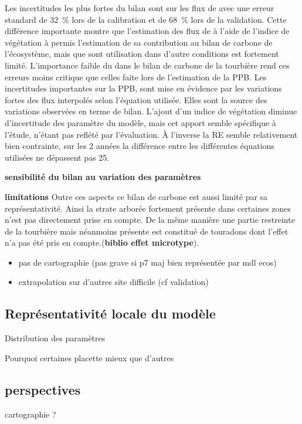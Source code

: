 Les incertitudes les plus fortes du bilan sont sur les flux de \chh avec une erreur standard de \SI{32}{\percent} lors de la calibration et de \SI{68}{\percent} lors de la validation.
Cette différence importante montre que l'estimation des flux de \chh à l'aide de l'indice de végétation à permis l'estimation de sa contribution au bilan de carbone de l'écosystème, mais que sont utilisation dans d'autre conditions est fortement limité.
L'importance faible du \chh dans le bilan de carbone de la tourbière rend ces erreurs moins critique que celles faite lors de l'estimation de la PPB.
Les incertitudes importantes sur la PPB, sont mise en évidence par les variations fortes des flux interpolés selon l'équation utilisée.
Elles sont la source des variations observées en terme de bilan.
L'ajout d'un indice de végétation diminue d'incertitude des paramètre du modèle, mais cet apport semble spécifique à l'étude, n'étant pas reflété par l'évaluation.
À l'inverse la RE semble relativement bien contrainte, sur les 2 années la différence entre les différentes équations utilisées ne dépassent pas \SI{25}{\gcma}.

\textbf{sensibilité du bilan au variation des paramètres}

\textbf{limitations}
Outre ces aspects ce bilan de carbone est aussi limité par sa représentativité. 
Ainsi la strate arborée fortement présente dans certaines zones n'est pas directement prise en compte.
De la même manière une partie restreinte de la tourbière mais néanmoins présente est constitué de touradons dont l'effet n'a pas été pris en compte.\plop (\textbf{biblio effet microtype}).


\begin{itemize}
\item pas de cartographie (pas grave si p7 maj bien représentée par mdl ecos)
\item extrapolation sur d'autres site difficile (cf validation)
\end{itemize}

\subsection{Représentativité locale du modèle}

Distribution des paramètres

Pourquoi certaines placette mieux que d'autres


\subsection{perspectives}

cartographie ?

